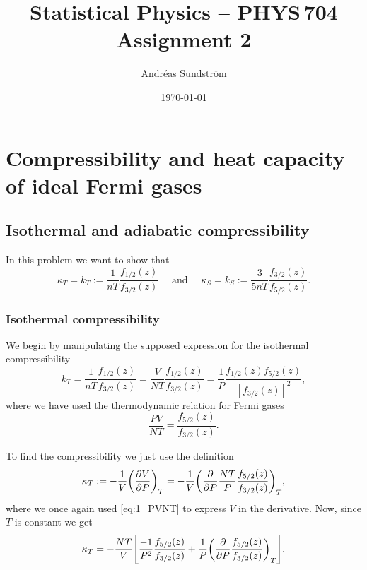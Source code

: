 \documentclass[11pt,letter, swedish, english
]{article}
\begin{document}
\title{Statistical Physics -- PHYS\,704 \\
Assignment 2}
\author{Andréas Sundström}
\date{\today}

\maketitle



\section{Compressibility and heat capacity of ideal Fermi gases}
\subsection{Isothermal and adiabatic compressibility}
In this problem we want to show that
\begin{equation}\label{eq:1_kappa}
\kappa_T = k_T:=\frac{1}{nT}\frac{f_{1/2}(z)}{f_{3/2}(z)}
\quad\text{ and }\quad
\kappa_S = k_S:=\frac{3}{5nT}\frac{f_{3/2}(z)}{f_{5/2}(z)}.
\end{equation}


\subsubsection{Isothermal compressibility}
We begin by manipulating the supposed expression for the isothermal
compressibility
\begin{equation}\label{eq:1_want_this_T}
k_T=\frac{1}{nT}\frac{f_{1/2}(z)}{f_{3/2}(z)}
= \frac{V}{NT}\frac{f_{1/2}(z)}{f_{3/2}(z)}
= \frac{1}{P}\frac{f_{1/2}(z)f_{5/2}(z)}{[f_{3/2}(z)]^2},
\end{equation}
where we have used the thermodynamic relation for Fermi gases
\begin{equation}\label{eq:1_PVNT}
\frac{PV}{NT}=\frac{f_{5/2}(z)}{f_{3/2}(z)}.
\end{equation}

To find the compressibility we just use the definition
\begin{equation}
\kappa_T:=-\frac{1}{V}\qty(\pdv{V}{P})_T
= -\frac{1}{V} \qty(\pdv{P} \frac{NT}{P}\frac{f_{5/2}(z)}{f_{3/2}(z)})_T,
\end{equation}
where we once again used \eqref{eq:1_PVNT} to express $V$ in the
derivative. Now, since $T$ is constant we get
\begin{equation}\label{eq:1_k_T_2}
\kappa_T
= -\frac{NT}{V} \qty[
\frac{-1}{P^2}\frac{f_{5/2}(z)}{f_{3/2}(z)}
+\frac{1}{P}\qty(\pdv{P}
\frac{f_{5/2}(z)}{f_{3/2}(z)}
)_T].
\end{equation}
\end{document}

